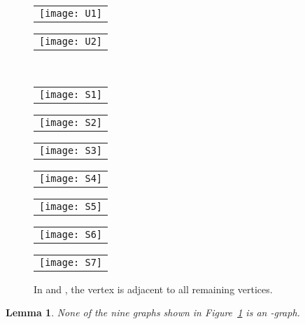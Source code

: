 \documentclass[11pt,3p,times]{elsarticle}
\newtheorem{lemma}[theorem]{Lemma}
\begin{document}
\begin{figure}
\centering \hfill
\begin{tabular}{c}
\texttt{[image: U1]} \\ 
\end{tabular}
\hfill
\begin{tabular}{c}
\texttt{[image: U2]} \\ 
\end{tabular}
\hfill \
\par
\begin{tabular}{c}
\texttt{[image: S1]} \\ 
\end{tabular}
\hfill
\begin{tabular}{c}
\texttt{[image: S2]} \\ 
\end{tabular}
\hfill
\begin{tabular}{c}
\texttt{[image: S3]} \\ 
\end{tabular}
\hfill
\begin{tabular}{c}
\texttt{[image: S4]} \\ 
\end{tabular}
\hfill
\begin{tabular}{c}
\texttt{[image: S5]} \\ 
\end{tabular}
\hfill
\begin{tabular}{c}
\texttt{[image: S6]} \\ 
\end{tabular}
\hfill
\begin{tabular}{c}
\texttt{[image: S7]} \\ 
\end{tabular}
\caption{In  and , the vertex  is adjacent to all
remaining vertices.}\label{fig:characterization}
\end{figure}
\begin{lemma}\label{lem:9graphs}
None of the nine graphs shown in Figure~\ref{fig:characterization}
is an -graph.
\end{lemma}
\end{document}
